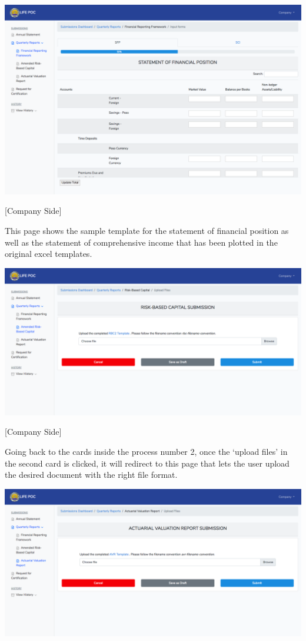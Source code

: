 \documentclass{article}
\begin{document}
\includegraphics[keepaspectratio=true]{up-ic-screens/image150}{}%

[Company Side]%

This page shows the sample template for the statement
of financial position as well as the statement of comprehensive income
that has been plotted in the original excel templates.%

\includegraphics[keepaspectratio=true]{up-ic-screens/image208}{}%

[Company Side]%

Going back to the cards inside the process number 2,
once the ‘upload files’ in the second card is clicked, it will redirect
to this page that lets the user upload the desired document with the
right file format.%

\includegraphics[keepaspectratio=true]{up-ic-screens/image75}{}%
\end{document}

